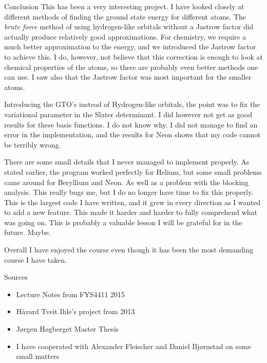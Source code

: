 \documentclass[a4paper, 12pt, titlepage]{article}
\begin{document}
\begin{section}{Conclusion}
 This has been a very interesting project. I have looked closely at different methods of finding the ground state energy for different atoms. The \textit{brute force} method of using hydrogen-like orbitals without a Jastrow factor did actually produce relatively good approximations. For chemistry, we require a much better approximation to the energy, and we introduced the Jastrow factor to achieve this. I do, however, not believe that this correction is enough to look at chemical properties of the atoms, so there are probably even better methods one can use. I saw also that the Jastrow factor was most important for the smaller atoms. \par
 Introducing the GTO's instead of Hydrogen-like orbitals, the point was to fix the variational parameter in the Slater determinant. I did however not get as good results for these basis functions. I do not know why. I did not manage to find an error in the implementation, and the results for Neon shows that my code cannot be terribly wrong. \par
 There are some small details that I never managed to implement properly. As stated earlier, the program worked perfectly for Helium, but some small problems came around for Beryllium and Neon. As well as a problem with the blocking analysis. This really bugs me, but I do no longer have time to fix this properly. This is the largest code I have written, and it grew in every direction as I wanted to add a new feature. This made it harder and harder to fully comprehend what was going on. This is probably a valuable lesson I will be grateful for in the future. Maybe. \par
 Overall I have enjoyed the course even though it has been the most demanding course I have taken. 
\end{section}
 
 \begin{section}{Sources}
  \begin{itemize}
  	\item Lecture Notes from FYS4411 2015
  	\item Håvard Tveit Ihle's project from 2013
  	\item Jørgen Høgberget Master Thesis
  	\item I have cooperated with Alexander Fleischer and Daniel Bjørnstad on some small matters
  \end{itemize}
 \end{section}
\end{document}
